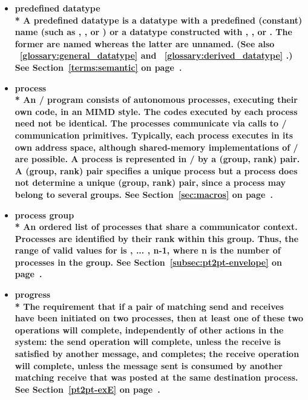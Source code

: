 \begin{itemize}
\label{glossary:predefined_datatype}
\item \bf{ predefined datatype} \\*
A predefined datatype is a datatype with a predefined (constant) name
(such as , , or )
or a datatype constructed with ,
, or
.  The former are {\bf named}
whereas the latter are {\bf unnamed}.
(See also ~\ref{glossary:general_datatype} and ~\ref{glossary:derived_datatype} .)
See Section~\ref{terms:semantic} on page~\pageref{terms:semantic}.

\label{glossary:process}
\item \bf{ process} \\*
An \MPI/ program consists of autonomous processes, executing their own
code, in an 
MIMD style. The codes executed by each process need not be
identical.  The processes communicate via calls to \MPI/ communication
primitives.  Typically, each process executes in its own address
space, although shared-memory implementations of \MPI/ are possible.
A process is represented in \MPI/ by a (group, rank) pair. 
A (group, rank) pair specifies a unique process but 
a process does not determine a unique (group, rank) pair, since
a process may belong to several groups.
See Section~\ref{sec:macros} on page~\pageref{sec:macros}.

\label{glossary:process_group}
\item \bf{ process group} \\*
An ordered list of processes that share a communicator context. Processes are identified by their
rank within this group.  Thus, the range of valid values for  is
{, ... , n-1}, where {\sf n} is the number of
processes in the group.  
See Section~\ref{subsec:pt2pt-envelope} on page~\pageref{subsec:pt2pt-envelope}.

\label{glossary:progress}
\item \bf{ progress} \\*
The requirement that
if a pair of
matching send and receives have been initiated on two processes, then at
least one of these two operations will complete, independently of
other actions in the system:  the send operation will
complete, unless the receive is satisfied by another message, and
completes; the
receive operation will complete, unless the message sent is consumed by another
matching receive that was posted at the same destination process.
See Section~\ref{pt2pt-exE} on page~\pageref{pt2pt-exE}.


\end{itemize}
